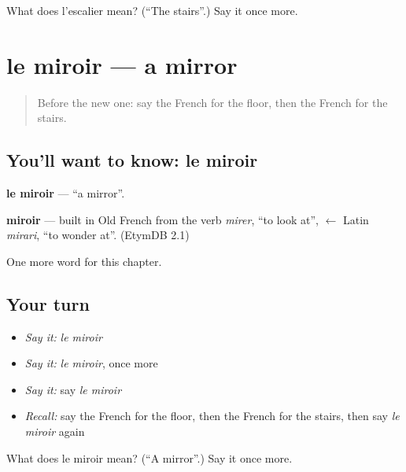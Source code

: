 \begin{tcolorbox}[breakable,colback=teal!4,colframe=teal!35!black,title={Before you move on}]
What does l'escalier mean? (\textquotedblleft{}The stairs\textquotedblright{}.) Say it once more.
\end{tcolorbox}
\section[le miroir]{le miroir — a mirror}

\label{lesson:FR-C75-miroir}



\begin{quote}
Before the new one: say the French for the floor, then the French for the stairs.
\end{quote}

\subsection*{You'll want to know: le miroir}
\textbf{le miroir} — \textquotedblleft{}a mirror\textquotedblright{}.

\begin{cousinweb}
\textbf{miroir} — built in Old French from the verb \emph{mirer}, \textquotedblleft{}to look at\textquotedblright{}, $\leftarrow$ Latin \emph{mirari}, \textquotedblleft{}to wonder at\textquotedblright{}. (EtymDB 2.1)
\end{cousinweb}

\begin{grammarlens}[title={What you've built}]
One more word for this chapter.
\end{grammarlens}

\subsection*{Your turn}
\begin{itemize}
\raggedright
  \item \emph{Say it:} \emph{le miroir}
  \item \emph{Say it:} \emph{le miroir}, once more
  \item \emph{Say it:} say \emph{le miroir}
  \item \emph{Recall:} say the French for the floor, then the French for the stairs, then say \emph{le miroir} again
\end{itemize}

\begin{tcolorbox}[breakable,colback=teal!4,colframe=teal!35!black,title={Before you move on}]
What does le miroir mean? (\textquotedblleft{}A mirror\textquotedblright{}.) Say it once more.
\end{tcolorbox}

